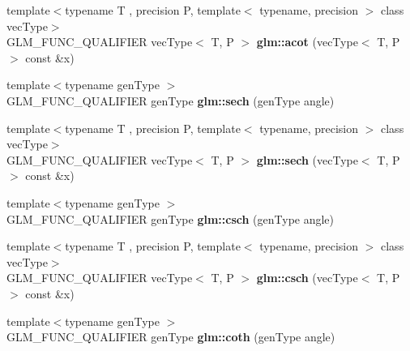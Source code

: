 \begin{DoxyCompactItemize}
\item 
\hypertarget{namespaceglm_a83b17146fd12b7822b1a6ef98790a8da}{{\footnotesize template$<$typename T , precision P, template$<$ typename, precision $>$ class vec\-Type$>$ }\\G\-L\-M\-\_\-\-F\-U\-N\-C\-\_\-\-Q\-U\-A\-L\-I\-F\-I\-E\-R vec\-Type$<$ T, P $>$ {\bfseries glm\-::acot} (vec\-Type$<$ T, P $>$ const \&x)}\label{namespaceglm_a83b17146fd12b7822b1a6ef98790a8da}

\item 
\hypertarget{namespaceglm_a624f38daef5fc0ac5dd3b0ebf3d5d0df}{{\footnotesize template$<$typename gen\-Type $>$ }\\G\-L\-M\-\_\-\-F\-U\-N\-C\-\_\-\-Q\-U\-A\-L\-I\-F\-I\-E\-R gen\-Type {\bfseries glm\-::sech} (gen\-Type angle)}\label{namespaceglm_a624f38daef5fc0ac5dd3b0ebf3d5d0df}

\item 
\hypertarget{namespaceglm_ad9b404c885d4fb0f7d227186b2444a10}{{\footnotesize template$<$typename T , precision P, template$<$ typename, precision $>$ class vec\-Type$>$ }\\G\-L\-M\-\_\-\-F\-U\-N\-C\-\_\-\-Q\-U\-A\-L\-I\-F\-I\-E\-R vec\-Type$<$ T, P $>$ {\bfseries glm\-::sech} (vec\-Type$<$ T, P $>$ const \&x)}\label{namespaceglm_ad9b404c885d4fb0f7d227186b2444a10}

\item 
\hypertarget{namespaceglm_abf6760fd12e46b2805237ff556d80d60}{{\footnotesize template$<$typename gen\-Type $>$ }\\G\-L\-M\-\_\-\-F\-U\-N\-C\-\_\-\-Q\-U\-A\-L\-I\-F\-I\-E\-R gen\-Type {\bfseries glm\-::csch} (gen\-Type angle)}\label{namespaceglm_abf6760fd12e46b2805237ff556d80d60}

\item 
\hypertarget{namespaceglm_aefec80643f2f2bde7247fa8d54ccd351}{{\footnotesize template$<$typename T , precision P, template$<$ typename, precision $>$ class vec\-Type$>$ }\\G\-L\-M\-\_\-\-F\-U\-N\-C\-\_\-\-Q\-U\-A\-L\-I\-F\-I\-E\-R vec\-Type$<$ T, P $>$ {\bfseries glm\-::csch} (vec\-Type$<$ T, P $>$ const \&x)}\label{namespaceglm_aefec80643f2f2bde7247fa8d54ccd351}

\item 
\hypertarget{namespaceglm_aa834c9345990c5373d6358732ea2fc03}{{\footnotesize template$<$typename gen\-Type $>$ }\\G\-L\-M\-\_\-\-F\-U\-N\-C\-\_\-\-Q\-U\-A\-L\-I\-F\-I\-E\-R gen\-Type {\bfseries glm\-::coth} (gen\-Type angle)}\label{namespaceglm_aa834c9345990c5373d6358732ea2fc03}


\end{DoxyCompactItemize}
